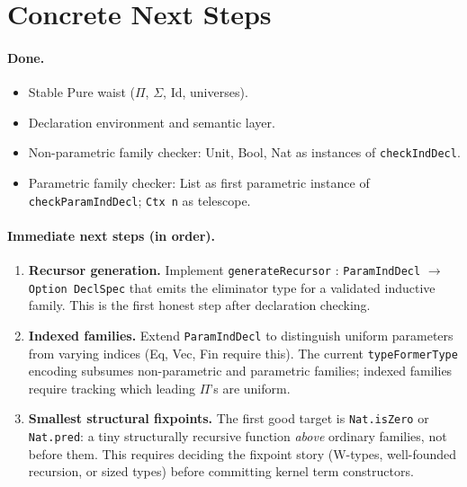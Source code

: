 \documentclass[11pt]{article}
\theoremstyle{remark}
\newcommand{\code}[1]{\texttt{#1}}
\newcommand{\leanref}[1]{\texttt{#1}}
\begin{document}
\section{Concrete Next Steps}
\label{sec:next}

\paragraph{Done.}
\begin{itemize}[nosep]
  \item[$\checkmark$] Stable Pure waist ($\Pi$, $\Sigma$, Id, universes).
  \item[$\checkmark$] Declaration environment and semantic layer.
  \item[$\checkmark$] Non-parametric family checker: Unit, Bool, Nat as
  instances of \leanref{checkIndDecl}.
  \item[$\checkmark$] Parametric family checker: List as first parametric
  instance of \leanref{checkParamIndDecl}; \leanref{Ctx n} as telescope.
\end{itemize}

\paragraph{Immediate next steps (in order).}
\begin{enumerate}
  \item \textbf{Recursor generation.}
  Implement \leanref{generateRecursor} : \leanref{ParamIndDecl} $\to$
  \leanref{Option DeclSpec} that emits the eliminator type for a validated
  inductive family.
  This is the first honest step after declaration checking.

  \item \textbf{Indexed families.}
  Extend \leanref{ParamIndDecl} to distinguish uniform parameters from
  varying indices (Eq, Vec, Fin require this).
  The current \leanref{typeFormerType} encoding subsumes non-parametric and
  parametric families; indexed families require tracking which leading
  $\Pi$'s are uniform.

  \item \textbf{Smallest structural fixpoints.}
  The first good target is \code{Nat.isZero} or \code{Nat.pred}: a tiny
  structurally recursive function \emph{above} ordinary families, not
  before them.
  This requires deciding the fixpoint story (W-types, well-founded recursion,
  or sized types) before committing kernel term constructors.
\end{enumerate}
\end{document}
